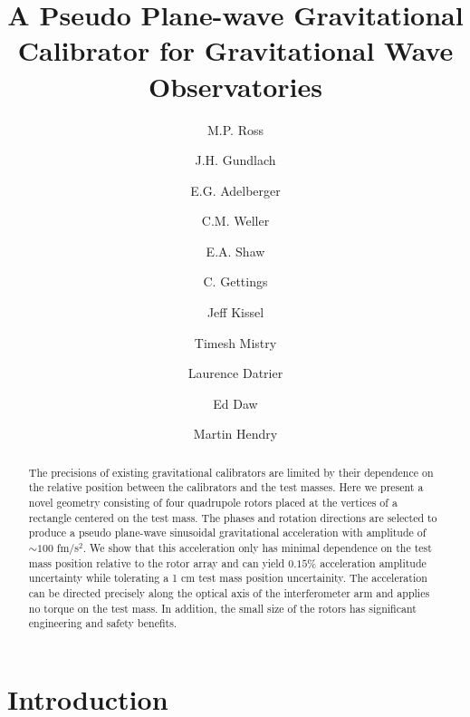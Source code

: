 \documentclass[superscriptaddress, twocolumn, prd]{revtex4-1}
\begin{document}
\title{A Pseudo Plane-wave Gravitational Calibrator for Gravitational Wave Observatories}

\author{M.P. Ross}
\author{J.H. Gundlach}
\author{E.G. Adelberger}
\author{C.M. Weller}
\author{E.A. Shaw}
\author{C. Gettings}
\author{Jeff Kissel}
\author{Timesh Mistry}
\author{Laurence Datrier}
\author{Ed Daw}
\author{Martin Hendry}



\begin{abstract}

 The precisions of existing gravitational calibrators are limited by their dependence on the relative position between the calibrators and the test masses. Here we present a novel geometry consisting of four quadrupole rotors placed at the vertices of a rectangle centered on the test mass. The phases and rotation directions are selected to produce a pseudo plane-wave  sinusoidal gravitational acceleration with amplitude of $\sim100$ fm/s$^2$. We show that this acceleration only has minimal dependence on the test mass position relative to the rotor array and can yield $0.15 \%$ acceleration amplitude uncertainty while tolerating a 1 cm test mass position uncertainity. The acceleration can be directed precisely along the optical axis of the interferometer arm and applies no torque on the test mass. In addition, the small size of the rotors has significant engineering and safety benefits.

\end{abstract}

\maketitle

\section{Introduction}
\end{document}
